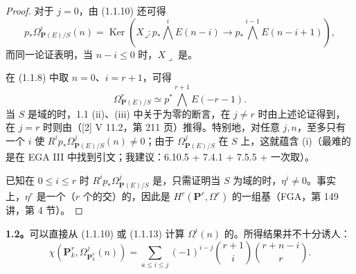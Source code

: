 \begin{proof}
对于 $j=0$，由 (1.1.10) 还可得
\[
p_*\Omega^i_{\mathbf P(E)/S}(n)=\operatorname{Ker}\left(X\mathbin{\lrcorner}:p_*\bigwedge^iE(n-i)\longrightarrow p_*\bigwedge^{i-1}E(n-i+1)\right),\tag{1.1.13}
\]
而同一论证表明，当 $n-i\leq0$ 时，$X\mathbin{\lrcorner}$ 是。

在 (1.1.8) 中取 $n=0$、$i=r+1$，可得
\[
\Omega^r_{\mathbf P(E)/S}\simeq p^*\bigwedge^{r+1}E(-r-1).
\]
当 $S$ 是域的时，1.1 (ii)、(iii) 中关于为零的断言，在 $j\ne r$ 时由上述论证得到，在 $j=r$ 时则由（[2] V 11.2，第 211 页）推得。特别地，对任意 $j,n$，至多只有一个 $i$ 使 $R^ip_*\Omega^j_{\mathbf P(E)/S}(n)\ne0$；由于 $\Omega^j_{\mathbf P(E)/S}$ 在 $S$ 上，这就蕴含 (i)（最难的是在 EGA III 中找到引文；我建议：6.10.5 + 7.4.1 + 7.5.5 + 一次取）。

已知在 $0\leq i\leq r$ 时 $R^ip_*\Omega^j_{\mathbf P(E)/S}$ 是，只需证明当 $S$ 为域的时，$\eta^i\ne0$。事实上，$\eta^r$ 是一个（$r$ 个的交）的，因此是 $H^r(\mathbf P^r,\Omega^r)$ 的一组基（FGA，第 149 讲，第 4 节）。
\end{proof}

\textbf{1.2。}可以直接从 (1.1.10) 或 (1.1.13) 计算 $\Omega^i(n)$ 的。所得结果并不十分诱人：
\[
\chi(\mathbf P_k^r,\Omega^j_{\mathbf P_k^r}(n))=
\sum_{a\leq i\leq j}(-1)^{i-j}\binom{r+1}{i}\binom{r+n-i}{r}.
\]

